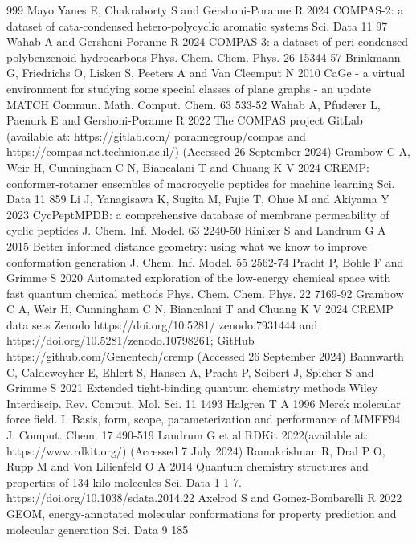 \documentclass[12pt]{article}
\begin{document}
\begin{thebibliography}{999}
 Mayo Yanes E, Chakraborty S and Gershoni-Poranne R 2024 COMPAS-2: a dataset of cata-condensed hetero-polycyclic aromatic systems Sci. Data 11 97
 Wahab A and Gershoni-Poranne R 2024 COMPAS-3: a dataset of peri-condensed polybenzenoid hydrocarbons Phys. Chem. Chem. Phys. 26 15344-57
 Brinkmann G, Friedrichs O, Lisken S, Peeters A and Van Cleemput N 2010 CaGe - a virtual environment for studying some special classes of plane graphs - an update MATCH Commun. Math. Comput. Chem. 63 533-52
 Wahab A, Pfuderer L, Paenurk E and Gershoni-Poranne R 2022 The COMPAS project GitLab (available at: https://gitlab.com/ porannegroup/compas and https://compas.net.technion.ac.il/) (Accessed 26 September 2024)
 Grambow C A, Weir H, Cunningham C N, Biancalani T and Chuang K V 2024 CREMP: conformer-rotamer ensembles of macrocyclic peptides for machine learning Sci. Data 11 859
 Li J, Yanagisawa K, Sugita M, Fujie T, Ohue M and Akiyama Y 2023 CycPeptMPDB: a comprehensive database of membrane permeability of cyclic peptides J. Chem. Inf. Model. 63 2240-50
 Riniker S and Landrum G A 2015 Better informed distance geometry: using what we know to improve conformation generation J. Chem. Inf. Model. 55 2562-74
 Pracht P, Bohle F and Grimme S 2020 Automated exploration of the low-energy chemical space with fast quantum chemical methods Phys. Chem. Chem. Phys. 22 7169-92
 Grambow C A, Weir H, Cunningham C N, Biancalani T and Chuang K V 2024 CREMP data sets Zenodo https://doi.org/10.5281/ zenodo.7931444 and https://doi.org/10.5281/zenodo.10798261; GitHub https://github.com/Genentech/cremp (Accessed 26 September 2024)
 Bannwarth C, Caldeweyher E, Ehlert S, Hansen A, Pracht P, Seibert J, Spicher S and Grimme S 2021 Extended tight-binding quantum chemistry methods Wiley Interdiscip. Rev. Comput. Mol. Sci. 11 1493
 Halgren T A 1996 Merck molecular force field. I. Basis, form, scope, parameterization and performance of MMFF94 J. Comput. Chem. 17 490-519
 Landrum G et al RDKit 2022(available at: https://www.rdkit.org/) (Accessed 7 July 2024)
 Ramakrishnan R, Dral P O, Rupp M and Von Lilienfeld O A 2014 Quantum chemistry structures and properties of 134 kilo molecules Sci. Data 1 1-7. https://doi.org/10.1038/sdata.2014.22
 Axelrod S and Gomez-Bombarelli R 2022 GEOM, energy-annotated molecular conformations for property prediction and molecular generation Sci. Data 9 185

\end{thebibliography}
\end{document}
